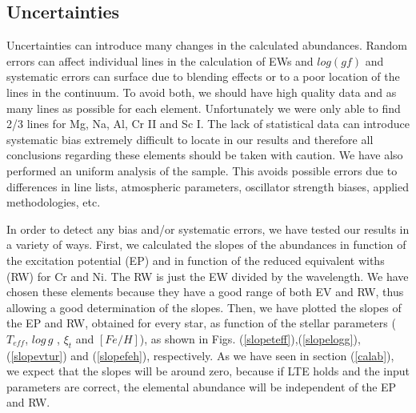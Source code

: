 \documentclass[dvips,12pt,a4paper]{report}
\begin{document}
{{\subsection {Uncertainties}
\label{uncertain}
Uncertainties can introduce many changes in the calculated abundances. Random errors can affect individual lines in the calculation of EWs and $log(gf)$ and systematic errors can surface due to blending effects or to a poor location of the lines in the continuum. To avoid both, we should have high quality data and as many lines as possible for each element. Unfortunately we were only able to find 2/3 lines for Mg, Na, Al, Cr II and Sc I. The lack of statistical data can introduce systematic bias extremely difficult to locate in our results and therefore all conclusions regarding these elements should be taken with caution. We have also performed an uniform analysis of the sample. This avoids possible errors due to differences in line lists, atmospheric parameters, oscillator strength biases, applied methodologies, etc. 

In order to detect any bias and/or systematic errors, we have tested our results in a variety of ways. First, we 
calculated the slopes of the abundances in function of the excitation potential (EP) and in function of the reduced equivalent withs (RW) for Cr and Ni. The RW is just the EW divided by the wavelength. We have chosen these elements because they have a good range of both EV and RW, thus allowing a good determination of the slopes. Then, we have plotted the slopes of the EP and RW, obtained for every star, as function of the stellar parameters ($T_{eff}$, $log\, g$ , $\xi_t$ and $[Fe/H]$), as shown in Figs. (\ref{slopeteff}),(\ref{slopelogg}),(\ref{slopevtur}) and (\ref{slopefeh}), respectively. As we have seen in section (\ref{calab}), we expect that the slopes will be around zero, because if LTE holds and the input parameters are correct, the elemental abundance will be independent of the EP and RW. 

}}
\end{document}
